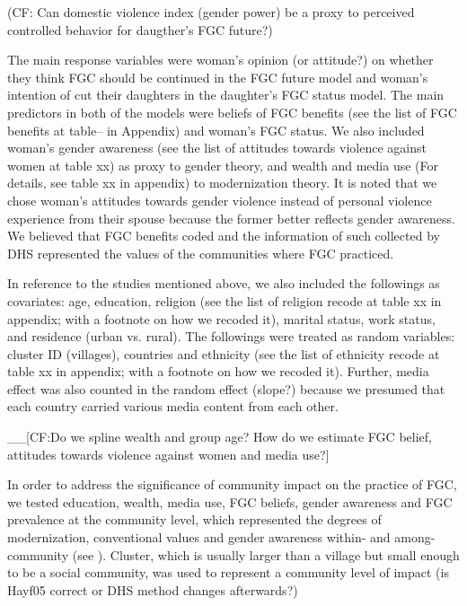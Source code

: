 \documentclass[12pt,]{article}
\begin{document}
(CF: Can domestic violence index (gender power) be a proxy to perceived controlled behavior for daugther's FGC future?)

The main response variables were woman's opinion (or attitude?) on whether they think FGC should be continued in the FGC future model and woman's intention of cut their daughters in the daughter's FGC status model.  The main predictors in both of the models were beliefs of FGC benefits (see the list of FGC benefits at table-- in Appendix) and woman's FGC status.  We also included woman's gender awareness (see the list of attitudes towards violence against women at table xx) as proxy to gender theory, and wealth and media use (For details, see table xx in appendix) to modernization theory.  It is noted that we chose woman's attitudes towards gender violence instead of personal violence experience from their spouse because the former better reflects gender awareness.  We believed that FGC benefits coded and the information of such collected by DHS represented the values of the communities where FGC practiced.

In reference to the studies mentioned above, we also included the followings as covariates:  age, education, religion (see the list of religion recode at table xx in appendix; with a footnote on how we recoded it), marital status, work status, and residence (urban vs. rural).  The followings were treated as random variables:  cluster ID (villages), countries and ethnicity (see the list of ethnicity recode at table xx in appendix; with a footnote on how we recoded it).  Further, media effect was also counted in the random effect (slope?) because we presumed that each country carried various media content from each other.

 \_\_{[}CF:Do we spline wealth and group age? How do we estimate FGC belief, attitudes towards violence against women and media use?{]}


In order to address the significance of community impact on the practice of FGC, we tested education, wealth, media use, FGC beliefs, gender awareness and FGC prevalence at the community level, which represented the degrees of modernization, conventional values and gender awareness within- and among-community (see \cite{Achi14, BoylMcMo02, Hayf05, KandNwak09, ModrLiu13, OdukAfol17}).  Cluster, which is usually larger than a village but small enough to be a social community, was used to represent a community level of impact \cite{Hayf05} (is Hayf05 correct or DHS method changes afterwards?)
\end{document}
